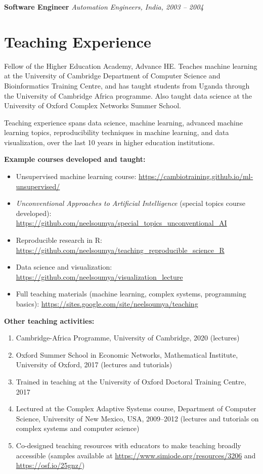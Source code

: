 \documentclass[11pt,a4paper]{article}
\newcommand{\entry}[3]{%
  \noindent\textbf{#1} \hfill \textit{#2}\\
  #3\par\smallskip
}
\begin{document}
\entry{Software Engineer}{Automation Engineers, India, 2003 -- 2004}{}

\section*{Teaching Experience}

Fellow of the Higher Education Academy, Advance HE. Teaches machine learning at the University of Cambridge Department of Computer Science and Bioinformatics Training Centre, and has taught students from Uganda through the University of Cambridge Africa programme. Also taught data science at the University of Oxford Complex Networks Summer School.

Teaching experience spans data science, machine learning, advanced machine learning topics, reproducibility techniques in machine learning, and data visualization, over the last 10 years in higher education institutions.

\textbf{Example courses developed and taught:}
\begin{itemize}
  \item Unsupervised machine learning course: \url{https://cambiotraining.github.io/ml-unsupervised/}
  \item \textit{Unconventional Approaches to Artificial Intelligence} (special topics course developed): \url{https://github.com/neelsoumya/special_topics_unconventional_AI}
  \item Reproducible research in R: \url{https://github.com/neelsoumya/teaching_reproducible_science_R}
  \item Data science and visualization: \url{https://github.com/neelsoumya/visualization_lecture}
  \item Full teaching materials (machine learning, complex systems, programming basics): \url{https://sites.google.com/site/neelsoumya/teaching}
\end{itemize}

\textbf{Other teaching activities:}
\begin{enumerate}
  \item Cambridge-Africa Programme, University of Cambridge, 2020 (lectures)
  \item Oxford Summer School in Economic Networks, Mathematical Institute, University of Oxford, 2017 (lectures and tutorials)
  \item Trained in teaching at the University of Oxford Doctoral Training Centre, 2017
  \item Lectured at the Complex Adaptive Systems course, Department of Computer Science, University of New Mexico, USA, 2009--2012 (lectures and tutorials on complex systems and computer science)
  \item Co-designed teaching resources with educators to make teaching broadly accessible (samples available at \url{https://www.simiode.org/resources/3206} and \url{https://osf.io/25gnz/})
\end{enumerate}
\end{document}
